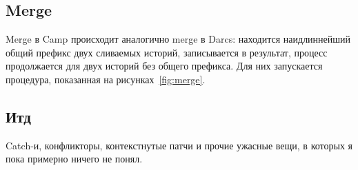 \subsection{Merge}

Merge в Camp происходит аналогично merge в Darcs: находится
наидлиннейший общий префикс двух сливаемых историй, записывается в
результат, процесс продолжается для двух историй без общего префикса.
Для них запускается процедура, показанная на рисунках~\ref{fig:merge}.

\subsection{Итд}

Catch-и, конфликторы, контекстнутые патчи и прочие ужасные вещи,
в которых я пока примерно ничего не понял.
